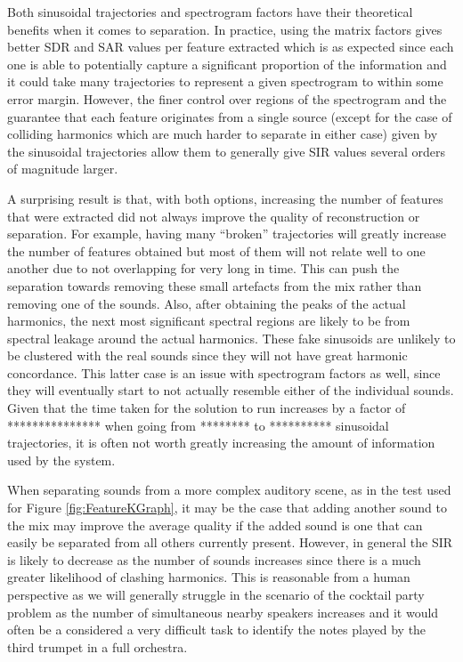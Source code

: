 \documentclass[10pt,twoside,a4paper]{report}
\begin{document}

Both sinusoidal trajectories and spectrogram factors have their theoretical benefits when it comes to separation. In practice, using the matrix factors gives better SDR and SAR values per feature extracted which is as expected since each one is able to potentially capture a significant proportion of the information and it could take many trajectories to represent a given spectrogram to within some error margin. However, the finer control over regions of the spectrogram and the guarantee that each feature originates from a single source (except for the case of colliding harmonics which are much harder to separate in either case) given by the sinusoidal trajectories allow them to generally give SIR values several orders of magnitude larger.

A surprising result is that, with both options, increasing the number of features that were extracted did not always improve the quality of reconstruction or separation. For example, having many ``broken'' trajectories will greatly increase the number of features obtained but most of them will not relate well to one another due to not overlapping for very long in time. This can push the separation towards removing these small artefacts from the mix rather than removing one of the sounds. Also, after obtaining the peaks of the actual harmonics, the next most significant spectral regions are likely to be from spectral leakage around the actual harmonics. These fake sinusoids are unlikely to be clustered with the real sounds since they will not have great harmonic concordance. This latter case is an issue with spectrogram factors as well, since they will eventually start to not actually resemble either of the individual sounds. Given that the time taken for the solution to run increases by a factor of *************** when going from ******** to ********** sinusoidal trajectories, it is often not worth greatly increasing the amount of information used by the system.

When separating sounds from a more complex auditory scene, as in the test used for Figure \ref{fig:FeatureKGraph}, it may be the case that adding another sound to the mix may improve the average quality if the added sound is one that can easily be separated from all others currently present. However, in general the SIR is likely to decrease as the number of sounds increases since there is a much greater likelihood of clashing harmonics. This is reasonable from a human perspective as we will generally struggle in the scenario of the cocktail party problem as the number of simultaneous nearby speakers increases and it would often be a considered a very difficult task to identify the notes played by the third trumpet in a full orchestra.
\end{document}
